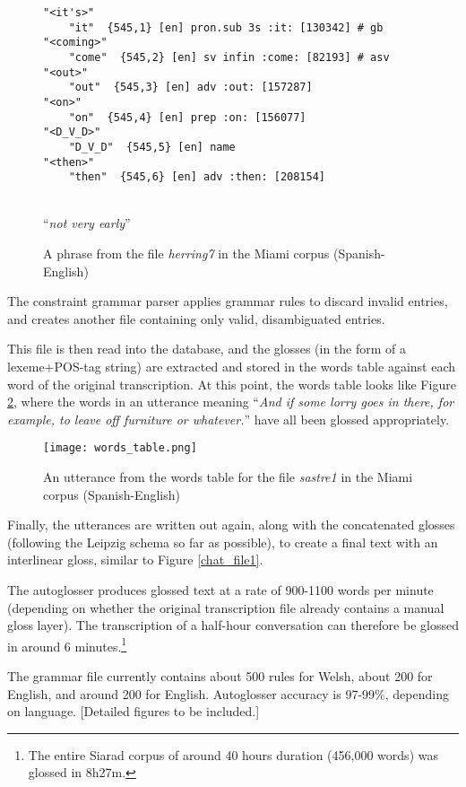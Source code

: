 \documentclass[11pt]{article}
\begin{document}
\begin{figure}[!hbtp]
\centering
\begin{footnotesize}
\begin{BVerbatim}
"<it's>"
    "it"  {545,1} [en] pron.sub 3s :it: [130342] # gb
"<coming>"
    "come"  {545,2} [en] sv infin :come: [82193] # asv
"<out>"
    "out"  {545,3} [en] adv :out: [157287]
"<on>"
    "on"  {545,4} [en] prep :on: [156077]
"<D_V_D>"
    "D_V_D"  {545,5} [en] name
"<then>"
    "then"  {545,6} [en] adv :then: [208154]
\end{BVerbatim}
\end{footnotesize}
\\ ``\textit{not very early}''
\caption{A phrase from the file \textit{herring7} in the Miami corpus (Spanish-English)}
\label{english_before}
\end{figure}

The constraint grammar parser applies grammar rules to discard invalid entries, and creates another file containing only valid, disambiguated entries.

This file is then read into the database, and the glosses (in the form of a lexeme+POS-tag string) are extracted and stored in the words table against each word of the original transcription.  At this point, the words table looks like Figure \ref{words_db}, where the words in an utterance meaning ``\textit{And if some lorry goes in there, for example, to leave off furniture or whatever.}'' have all been glossed appropriately.

\begin{figure}[!hbtp]
\centering
\texttt{[image: words\_table.png]}
\caption{An utterance from the words table for the file \textit{sastre1} in the Miami corpus (Spanish-English)}
\label{words_db}
\end{figure}

Finally, the utterances are written out again, along with the concatenated glosses (following the Leipzig schema \cite{leipzig2008} so far as possible), to create a final text with an interlinear gloss, similar to Figure \ref{chat_file1}.

The autoglosser produces glossed text at a rate of 900-1100 words per minute (depending on whether the original transcription file already contains a manual gloss layer).  The transcription of a half-hour conversation can therefore be glossed in around 6 minutes.\footnote{The entire Siarad corpus of around 40 hours duration (456,000 words) was glossed in 8h27m.} 

The grammar file currently contains about 500 rules for Welsh, about 200 for English, and around 200 for English.  Autoglosser accuracy is 97-99\%, depending on language. [Detailed figures to be included.]
\end{document}
